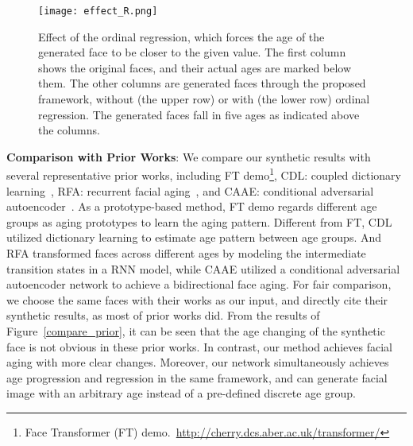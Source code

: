 \documentclass{article}
\begin{document}
\begin{table}[ht]
    \centering
    \caption{The comparisions between CMAAE-OR with oridnal regression ($R$) and CMAAE-OR without $R$. The performance is measured by the Mean Absolute Error (MAE) metric.}\label{MAE}
\vspace{-1em}
\end{table}

\begin{figure}[!ht]
\centering
\texttt{[image: effect\_R.png]}
\caption{Effect of the ordinal regression, which forces the age of the generated face to be closer to the given value. The first column shows the original faces, and their actual ages are marked below them. The other columns are generated faces through the proposed framework, without (the upper row) or with (the lower row) ordinal regression. The generated faces fall in five ages as indicated above the columns.}
\label{effect_r}
\end{figure}

{\bf\noindent Comparison with Prior Works}:
We compare our synthetic results with several representative prior works, including FT demo\footnote{Face Transformer (FT) demo.~\url{http://cherry.dcs.aber.ac.uk/transformer/}}, CDL: coupled dictionary learning~\cite{shu2015personalized}, RFA: recurrent facial aging~\cite{wang2016recurrent}, and CAAE: conditional adversarial autoencoder~\cite{zhang2017age}. As a prototype-based method, FT demo regards different age groups as aging prototypes to learn the aging pattern. Different from FT,  CDL utilized dictionary learning to estimate age pattern between age groups. And RFA transformed faces across different ages by modeling the intermediate transition states in a RNN model, while CAAE utilized a conditional adversarial autoencoder network to achieve a bidirectional face aging. For fair comparison, we choose the same faces with their works as our input, and directly cite their synthetic results, as most of prior works did. From the results of Figure~\ref{compare_prior}, it can be seen that the age changing of the synthetic face is not obvious in these prior works. In contrast, our method achieves facial aging with more clear changes. Moreover, our network simultaneously achieves age progression and regression in the same framework, and can generate facial image with an arbitrary age instead of a pre-defined discrete age group.
\end{document}
